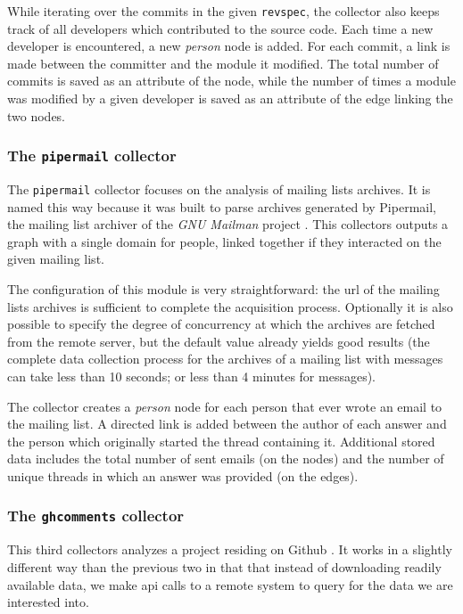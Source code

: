 While iterating over the commits in the given \texttt{revspec}, the collector also keeps track of all developers which contributed to the source code. Each time a new developer is encountered, a new \emph{person} node is added. For each commit, a link is made between the committer and the module it modified. The total number of commits is saved as an attribute of the node, while the number of times a module was modified by a given developer is saved as an attribute of the edge linking the two nodes.

\subsubsection{The \texttt{pipermail} collector}

The \texttt{pipermail} collector focuses on the analysis of mailing lists archives. It is named this way because it was built to parse archives generated by Pipermail, the mailing list archiver of the \emph{GNU Mailman} project \cite{mailman}. This collectors outputs a graph with a single domain for people, linked together if they interacted on the given mailing list.

The configuration of this module is very straightforward: the \gls{url} of the mailing lists archives is sufficient to complete the acquisition process. Optionally it is also possible to specify the degree of concurrency at which the archives are fetched from the remote server, but the default value already yields good results (the complete data collection process for the archives of a mailing list with  messages can take less than 10 seconds; or less than 4 minutes for  messages).

The collector creates a \emph{person} node for each person that ever wrote an email to the mailing list. A directed link is added between the author of each answer and the person which originally started the thread containing it. Additional stored data includes the total number of sent emails (on the nodes) and the number of unique threads in which an answer was provided (on the edges).

\subsubsection{The \texttt{ghcomments} collector}

This third collectors analyzes a project residing on Github \cite{gh}. It works in a slightly different way than the previous two in that that instead of downloading readily available data, we make \gls{api} calls to a remote system \cite{ghapi} to query for the data we are interested into.

